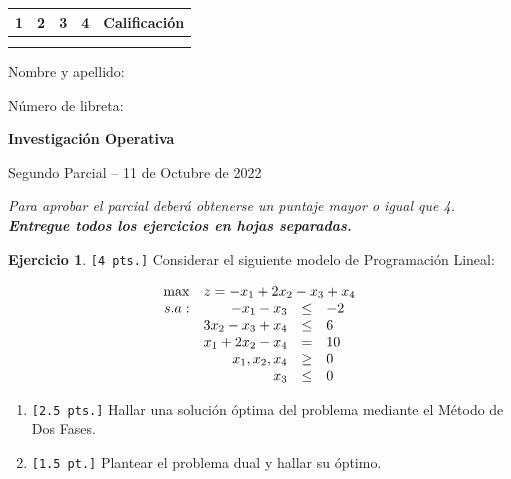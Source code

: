 \documentclass[a4paper,oneside,11pt]{amsart}
\newcommand{\nombremateria}
{Investigaci\'on Operativa}
\newcommand{\numeroparcial}
    { Segundo Parcial }
\newcommand{\fecha}
    {11 de Octubre de 2022}
\theoremstyle{definition}
\newtheorem{quest}{Ejercicio}
\begin{document}
\hfill \hfill
\begin{tabular}[c]{|c|c|c|c|c|}
\hline 
1 & 2 & 3 & 4 & Calificaci\'on \\ \hline \hline
\hspace{1 cm} & \hspace{1 cm} & \hspace{1 cm} & \hspace{1 cm} & \hspace{1.3 cm} \\
\hspace{1 cm} & \hspace{1  cm} & \hspace{1  cm} & \hspace{1  cm} & \hspace{1.3 cm} \\ \hline

\end{tabular}

\vspace{-1cm}

\noindent Nombre y apellido:

\vspace{0.2cm}

\noindent Número de libreta:

\noindent \hrulefill 

\smallskip
\renewcommand{\baselinestretch}{1.1}

\begin{center}
	\large \textbf{\nombremateria} 
	
	\numeroparcial -- \fecha
\end{center}

\noindent\textit{Para aprobar el parcial deberá obtenerse un puntaje mayor o igual que 4. \textbf{Entregue todos los ejercicios en hojas separadas.}}
\renewcommand{\theenumi}{\textbf{\arabic{enumi}}}

\fontsize{10.5pt}{0.4cm}\selectfont
\begin{quest} \verb|[4 pts.]| Considerar el siguiente modelo de Programación Lineal:

\[
\begin{array}{rrcl}
\max & \multicolumn{3}{l}{z = -x_1+2x_2-x_3+x_4} \\
s.a: & -x_1-x_3 & \leq & -2 \\
 & 3x_2-x_3+x_4 & \leq & 6 \\
 & x_1+2x_2-x_4 & = & 10 \\
 & x_1,x_2,x_4 & \geq & 0 \\
 & x_3 & \leq & 0 \\
 
\end{array}
\]
\begin{enumerate}[label=\alph*)]
    \item \verb|[2.5 pts.]| Hallar una solución óptima del problema mediante el Método de Dos Fases.
    \item \verb|[1.5 pt.]| Plantear el problema dual y hallar su óptimo.
\end{enumerate}

\end{quest}
\end{document}
